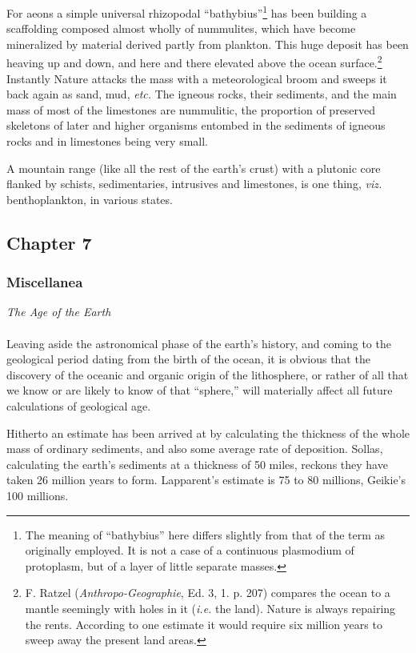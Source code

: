 \documentclass[a4paper, 12pt, oneside, landscape]{article}
\begin{document}
For aeons a simple universal rhizopodal ``bathybius''\footnote{The meaning of ``bathybius'' here differs slightly from that of the term as originally employed. It is not a case of a continuous plasmodium of protoplasm, but of a layer of little separate masses.} has been building a scaffolding composed almost wholly of nummulites, which have become mineralized by material derived partly from plankton. This huge deposit has been heaving up and down, and here and there elevated above the ocean surface.\footnote{F. Ratzel (\emph{Anthropo-Geographie}, Ed. 3, 1. p. 207) compares the ocean to a mantle seemingly with holes in it (\emph{i.e.} the land). Nature is always repairing the rents. According to one estimate it would require six million years to sweep away the present land areas.} Instantly Nature attacks the mass with a meteorological broom and sweeps it back again as sand, mud, \emph{etc.} The igneous rocks, their sediments, and the main mass of most of the limestones are nummulitic, the proportion of preserved skeletons of later and higher organisms entombed in the sediments of igneous rocks and in limestones being very small.

A mountain range (like all the rest of the earth's crust) with a plutonic core flanked by schists, sedimentaries, intrusives and limestones, is one thing, \emph{viz.} benthoplankton, in various states.
\clearpage
\subsection{Chapter 7}
\subsubsection{Miscellanea}
\centerline{\emph{The Age of the Earth}}
\paragraph{}
Leaving aside the astronomical phase of the earth's history, and coming to the geological period dating from the birth of the ocean, it is obvious that the discovery of the oceanic and organic origin of the lithosphere, or rather of all that we know or are likely to know of that ``sphere,'' will materially affect all future calculations of geological age.

Hitherto an estimate has been arrived at by calculating the thickness of the whole mass of ordinary sediments, and also some average rate of deposition. Sollas, calculating the earth's sediments at a thickness of 50 miles, reckons they have taken 26 million years to form. Lapparent's estimate is 75 to 80 millions, Geikie's 100 millions.
\end{document}
